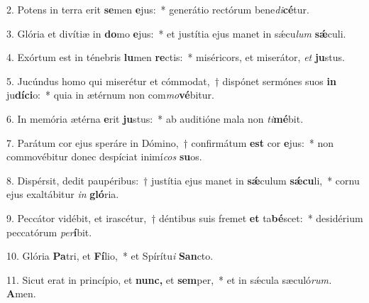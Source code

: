 \item 2. Potens in terra erit \textbf{se}men \textbf{e}jus:~* generátio rectórum bene\hspace{0.03em}\textit{di}\textbf{cé}tur.
\item 3. Glória et divítiæ in \textbf{do}mo \textbf{e}jus:~* et justítia ejus manet in sǽcu\hspace{0.03em}\textit{lum} \textbf{sǽ}culi.
\item 4. Exórtum est in ténebris \textbf{lu}men \textbf{re}ctis:~* miséricors, et miserátor, \textit{et} \textbf{ju}stus.
\item 5. Jucúndus homo qui miserétur et cómmodat,~† dispónet sermónes suos \textbf{in} ju\textbf{dí}\textbf{ci}o:~* quia in ætérnum non com\textit{mo}\textbf{vé}bitur.
\item 6. In memória ætérna \textbf{e}rit \textbf{ju}stus:~* ab auditióne mala non \textit{ti}\textbf{mé}bit.
\item 7. Parátum cor ejus speráre in Dómino,~† confirmátum \textbf{est} cor \textbf{e}jus:~* non commovébitur donec despíciat inimí\hspace{0.03em}\textit{cos} \textbf{su}os.
\item 8. Dispérsit, dedit paupéribus:~† justítia ejus manet in \textbf{sǽ}culum \textbf{sǽ}\textbf{cu}li,~* cornu ejus exaltábitur \textit{in} \textbf{gló}ria.
\item 9. Peccátor vidébit, et irascétur,~† déntibus suis fremet \textbf{et} ta\textbf{bé}scet:~* desidérium peccatórum \textit{per}\textbf{í}bit.
\item 10. Glória \textbf{Pa}tri, et \textbf{Fí}lio,~* et Spírítu\textit{i} \textbf{San}cto.
\item 11. Sicut erat in princípio, et \textbf{nunc,} et \textbf{sem}per,~* et in sǽcula sæculó\textit{rum.} \textbf{A}men.